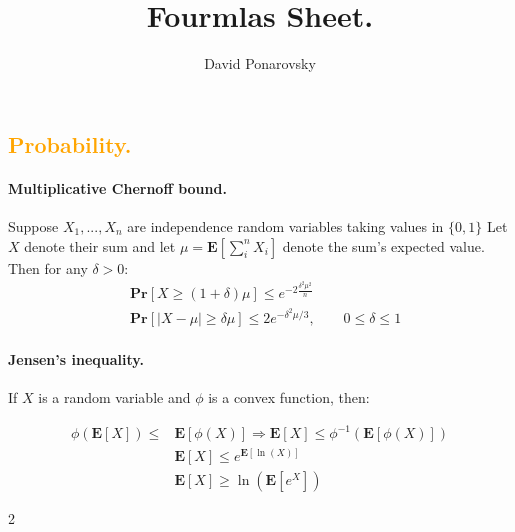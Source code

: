 \documentclass{article}
\newcommand{\prb}[1]{ \mathbf{Pr} \left[ {#1} \right]}
\newcommand{\expp}[1]{ \mathbf{E} \left[ {#1} \right]}
\begin{document}
\title{Fourmlas Sheet.} 
\author{David Ponarovsky}
\maketitle
\begin{multicols*}{2}
  \subsection*{{\textcolor{orange}{Probability.}} } 
\paragraph{Multiplicative Chernoff bound.} Suppose $ X_1, ..., X_n$ are independence random variables taking values in $\{0, 1\}$ Let $X$ denote their sum and let $\mu = \expp{\sum_{i}^{n}{X_{i}}} $  denote the sum's expected value. Then for any $\delta > 0$: 
\begin{equation*}
    \begin{split}
     & \prb{X \ge \left( 1+\delta \right) \mu }  \le e^{-2\frac{\delta^2\mu^{2}}{n}} \\ 
     & \prb{|X - \mu| \ge \delta\mu }  \le 2e^{-\delta^2\mu/3}, \qquad 0 \le \delta \le 1
    \end{split}
  \end{equation*}
  \paragraph{Jensen's inequality.} If $X$ is a random variable and $\phi$ is a convex function, then:

  \begin{equation*}
    \begin{split}
       \phi\left( \expp{X} \right) \le & \expp{\phi\left( X \right)} \Rightarrow   \expp{X} \le \phi^{-1} \left( \expp{\phi\left( X \right)} \right) \\
      &  \expp{X} \le e^{\expp{\ln \left( X \right)}} \\ 
      & \expp{X} \ge \ln\left(\expp{e^{X}}  \right)   
    \end{split}
  \end{equation*}
\end{multicols*}{2}
\end{document}
